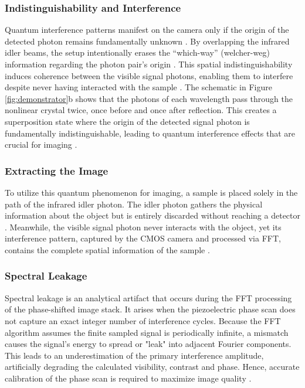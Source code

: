 \documentclass[12pt,a4paper]{article}
\begin{document}
    \subsubsection{Indistinguishability and Interference}
        Quantum interference patterns manifest on the camera only if the origin of the detected photon remains fundamentally unknown \cite{NonlinearInterferometry, lemos2014quantum}. By overlapping the infrared idler beams, the setup intentionally erases the ``which-way'' (welcher-weg) information regarding the photon pair's origin \cite{lemos2014quantum}. This spatial indistinguishability induces coherence between the visible signal photons, enabling them to interfere despite never having interacted with the sample \cite{pearce2023practical, NonlinearInterferometry}. 
        The schematic in Figure \ref{fig:demonstrator}b shows that the photons of each wavelength pass through the nonlinear crystal twice, once before and once after reflection. This creates a superposition state where the origin of the detected signal photon is fundamentally indistinguishable, leading to quantum interference effects that are crucial for imaging \cite{NonlinearInterferometry}.
        
    \subsubsection{Extracting the Image}
        To utilize this quantum phenomenon for imaging, a sample is placed solely in the path of the infrared idler photon. The idler photon gathers the physical information about the object but is entirely discarded without reaching a detector \cite{lemos2014quantum}. Meanwhile, the visible signal photon never interacts with the object, yet its interference pattern, captured by the \ac{CMOS} camera and processed via \ac{FFT}, contains the complete spatial information of the sample \cite{kutas2021quantum, pearce2023practical}.
                    
    \subsubsection{Spectral Leakage} 
        Spectral leakage is an analytical artifact that occurs during the \ac{FFT} processing of the phase-shifted image stack. 
        It arises when the piezoelectric phase scan does not capture an exact integer number of interference cycles. Because the \ac{FFT} algorithm assumes the finite sampled signal is periodically infinite, a mismatch causes the signal's energy to spread or "leak" into adjacent Fourier components. This leads to an underestimation of the primary interference amplitude, artificially degrading the calculated visibility, contrast and phase. Hence, accurate calibration of the phase scan is required to maximize image quality \cite{SpectralLeakageEssentials}.
\end{document}
